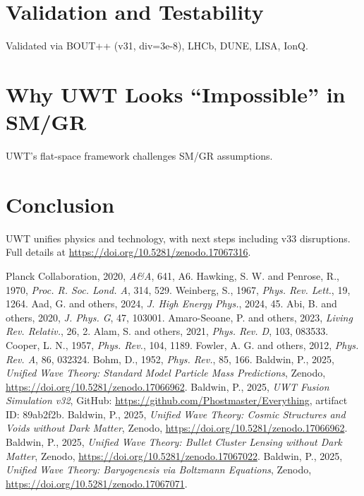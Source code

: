 \documentclass{article}
\begin{document}
\section{Validation and Testability}
Validated via BOUT++ (v31, div=3e-8), LHCb, DUNE, LISA, IonQ.
\section{Why UWT Looks “Impossible” in SM/GR}
UWT’s flat-space framework challenges SM/GR assumptions.
\section{Conclusion}
UWT unifies physics and technology, with next steps including v33 disruptions. Full details at \url{https://doi.org/10.5281/zenodo.17067316}.
\begin{thebibliography}{9}
 Planck Collaboration, 2020, \textit{A\&A}, 641, A6.
 Hawking, S. W. and Penrose, R., 1970, \textit{Proc. R. Soc. Lond. A}, 314, 529.
 Weinberg, S., 1967, \textit{Phys. Rev. Lett.}, 19, 1264.
 Aad, G. and others, 2024, \textit{J. High Energy Phys.}, 2024, 45.
 Abi, B. and others, 2020, \textit{J. Phys. G}, 47, 103001.
 Amaro-Seoane, P. and others, 2023, \textit{Living Rev. Relativ.}, 26, 2.
 Alam, S. and others, 2021, \textit{Phys. Rev. D}, 103, 083533.
 Cooper, L. N., 1957, \textit{Phys. Rev.}, 104, 1189.
 Fowler, A. G. and others, 2012, \textit{Phys. Rev. A}, 86, 032324.
 Bohm, D., 1952, \textit{Phys. Rev.}, 85, 166.
 Baldwin, P., 2025, \textit{Unified Wave Theory: Standard Model Particle Mass Predictions}, Zenodo, \url{https://doi.org/10.5281/zenodo.17066962}.
 Baldwin, P., 2025, \textit{UWT Fusion Simulation v32}, GitHub: \url{https://github.com/Phostmaster/Everything}, artifact ID: 89ab2f2b.
 Baldwin, P., 2025, \textit{Unified Wave Theory: Cosmic Structures and Voids without Dark Matter}, Zenodo, \url{https://doi.org/10.5281/zenodo.17066962}.
 Baldwin, P., 2025, \textit{Unified Wave Theory: Bullet Cluster Lensing without Dark Matter}, Zenodo, \url{https://doi.org/10.5281/zenodo.17067022}.
 Baldwin, P., 2025, \textit{Unified Wave Theory: Baryogenesis via Boltzmann Equations}, Zenodo, \url{https://doi.org/10.5281/zenodo.17067071}.

\end{thebibliography}
\end{document}
